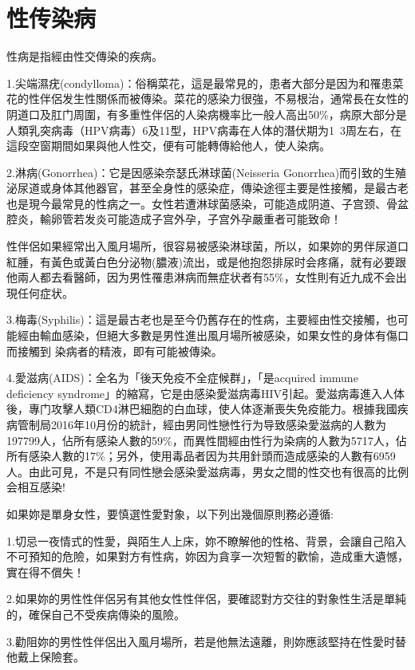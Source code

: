\documentclass[12pt,UTF8]{ctexbook}
\begin{document}
\part{性传染病}

性病是指經由性交傳染的疾病。

1.尖端濕疣(condylloma)：俗稱菜花，這是最常見的，患者大部分是因为和罹患菜花的性伴侶发生性關係而被傳染。菜花的感染力很強，不易根治，通常長在女性的阴道口及肛门周圍，有多重性伴侶的人染病機率比一般人高出50\%，病原大部分是人類乳突病毒（HPV病毒）6及11型，HPV病毒在人体的潛伏期为1~3周左右，在這段空窗期間如果與他人性交，便有可能轉傳給他人，使人染病。

2.淋病(Gonorrhea)：它是因感染奈瑟氏淋球菌(Neisseria Gonorrhea)而引致的生殖泌尿道或身体其他器官，甚至全身性的感染症，傳染途徑主要是性接觸，是最古老也是現今最常見的性病之一。女性若遭淋球菌感染，可能造成阴道、子宫颈、骨盆腔炎，輸卵管若发炎可能造成子宫外孕，子宫外孕嚴重者可能致命！

性伴侶如果經常出入風月場所，很容易被感染淋球菌，所以，如果妳的男伴尿道口紅腫，有黃色或黃白色分泌物(膿液)流出，或是他抱怨排尿时会疼痛，就有必要跟他兩人都去看醫師，因为男性罹患淋病而無症状者有55\%，女性則有近九成不会出現任何症状。

3.梅毒(Syphilis)：這是最古老也是至今仍舊存在的性病，主要經由性交接觸，也可能經由輸血感染，但絕大多數是男性進出風月場所被感染，如果女性的身体有傷口而接觸到
染病者的精液，即有可能被傳染。

4.愛滋病(AIDS)：全名为「後天免疫不全症候群」，「是acquired immune deficiency syndrome」的縮寫，它是由感染愛滋病毒HIV引起。愛滋病毒進入人体後，專门攻擊人類CD4淋巴細胞的白血球，使人体逐漸喪失免疫能力。根據我國疾病管制局2016年10月份的統計，經由男同性戀性行为导致感染愛滋病的人數为197799人，佔所有感染人數的59\%，而異性間經由性行为染病的人數为5717人，佔所有感染人數的17\%；另外，使用毒品者因为共用針頭而造成感染的人數有6959人。由此可見，不是只有同性戀会感染愛滋病毒，男女之間的性交也有很高的比例会相互感染!

如果妳是單身女性，要慎選性愛對象，以下列出幾個原則務必遵循:

1.切忌一夜情式的性愛，與陌生人上床，妳不瞭解他的性格、背景，会讓自己陷入不可預知的危險，如果對方有性病，妳因为貪享一次短暫的歡愉，造成重大遺憾，實在得不償失！

2.如果妳的男性性伴侶另有其他女性性伴侶，要確認對方交往的對象性生活是單純的，確保自己不受疾病傳染的風險。

3.勸阻妳的男性性伴侶出入風月場所，若是他無法遠離，則妳應該堅持在性愛时替他戴上保險套。
\end{document}
